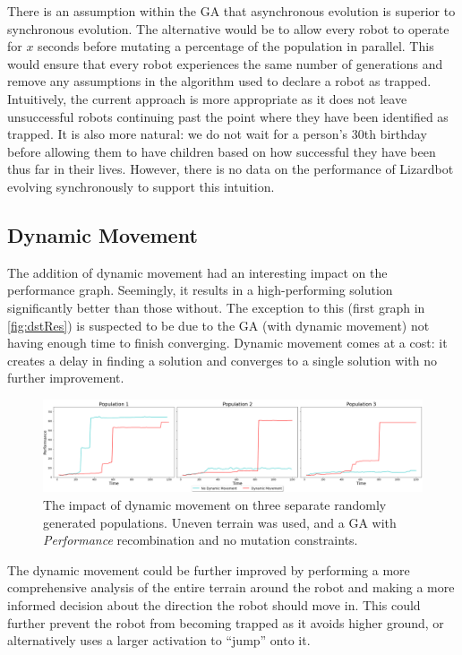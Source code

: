 \documentclass{article}
\begin{document}
There is an assumption within the GA that asynchronous evolution is superior to synchronous evolution. The alternative would be to allow every robot to operate for $x$ seconds before mutating a percentage of the population in parallel. This would ensure that every robot experiences the same number of generations and remove any assumptions in the algorithm used to declare a robot as trapped. \\
Intuitively, the current approach is more appropriate as it does not leave unsuccessful robots continuing past the point where they have been identified as trapped. It is also more natural: we do not wait for a person’s 30th birthday before allowing them to have children based on how successful they have been thus far in their lives. However, there is no data on the performance of Lizardbot evolving synchronously to support this intuition.\\

\newpage
\subsection{Dynamic Movement}
\label{sec:DST Res}
The addition of dynamic movement had an interesting impact on the performance graph. Seemingly, it results in a high-performing solution significantly better than those without. The exception to this (first graph in \autoref{fig:dstRes}) is suspected to be due to the GA (with dynamic movement) not having enough time to finish converging. Dynamic movement comes at a cost: it creates a delay in finding a solution and converges to a single solution with no further improvement.
\begin{figure}[H]
\centering
\centerline{\includegraphics[scale=0.55]{dstResults} }
\caption{The impact of dynamic movement on three separate randomly generated populations. Uneven terrain was used, and a GA with \textit{Performance} recombination and no mutation constraints.}
\label{fig:dstRes}
\end{figure}
The dynamic movement could be further improved by performing a more comprehensive analysis of the entire terrain around the robot and making a more informed decision about the direction the robot should move in. This could further prevent the robot from becoming trapped as it avoids higher ground, or alternatively uses a larger activation to “jump” onto it.\\
\end{document}
